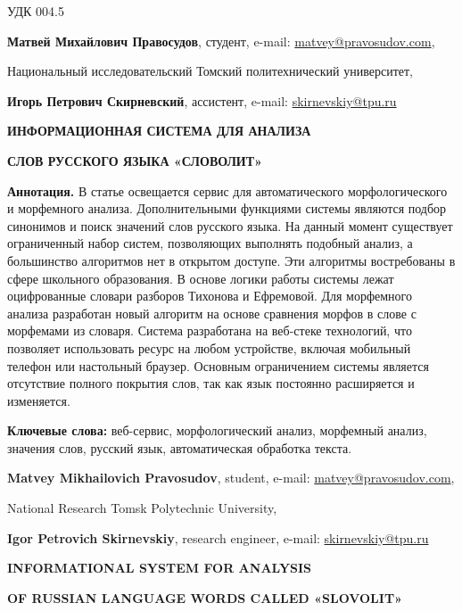 \documentclass[a4paper,12pt]{article}
\begin{document}
{\setlength{\parindent}{0cm}
УДК 004.5

\textbf{Матвей Михайлович Правосудов}, студент, e-mail: \href{mailto:matvey@pravosudov.com}{matvey@pravosudov.com}, 

Национальный исследовательский Томский политехнический университет,

\textbf{Игорь Петрович Скирневский}, ассистент, e-mail: \href{mailto:skirnevskiy@tpu.ru}{skirnevskiy@tpu.ru}
}

\begin{center}
\textbf{\MakeUppercase{Информационная система для анализа}}

\textbf{\MakeUppercase{слов русского языка «Словолит»}}
\end{center}

\textbf{Аннотация.} В статье освещается сервис для автоматического морфологического и морфемного анализа. Дополнительными функциями системы являются подбор синонимов и поиск значений слов русского языка. На данный момент существует ограниченный набор систем, позволяющих выполнять подобный анализ, а большинство алгоритмов нет в открытом доступе. Эти алгоритмы востребованы в сфере школьного образования. В основе логики работы системы лежат оцифрованные словари разборов Тихонова и Ефремовой. Для морфемного анализа разработан новый алгоритм на основе сравнения морфов в слове с морфемами из словаря. Система разработана на веб-стеке технологий, что позволяет использовать ресурс на любом устройстве, включая мобильный телефон или настольный браузер. Основным ограничением системы является отсутствие полного покрытия слов, так как язык постоянно расширяется и изменяется.

\textbf{Ключевые слова:} веб-сервис, морфологический анализ, морфемный анализ, значения слов, русский язык, автоматическая обработка текста.\\

{\setlength{\parindent}{0cm}
\textbf{Matvey Mikhailovich Pravosudov}, student, e-mail: \href{mailto:matvey@pravosudov.com}{matvey@pravosudov.com}, 

National Research Tomsk Polytechnic University,

\textbf{Igor Petrovich Skirnevskiy}, research engineer, e-mail: \href{mailto:skirnevskiy@tpu.ru}{skirnevskiy@tpu.ru}
}

\begin{center}
\textbf{\MakeUppercase{Informational system for analysis}}

\textbf{\MakeUppercase{of Russian language words called «Slovolit»}}
\end{center}
\end{document}
